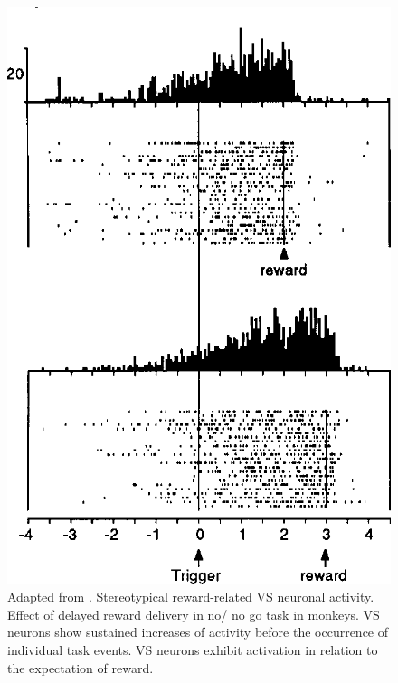 \begin{figure}[H]
    \centering
    \includegraphics[scale=0.22]{figures/StriatumR.png}
    \caption{Adapted from \cite{Schultz1992}. Stereotypical reward-related VS neuronal activity. Effect of delayed reward delivery in no/ no go task in monkeys. VS neurons show sustained increases of activity before the occurrence of individual task events. VS neurons exhibit activation in relation to the expectation of reward.}
    \label{fig:StriatumN}
\end{figure}
